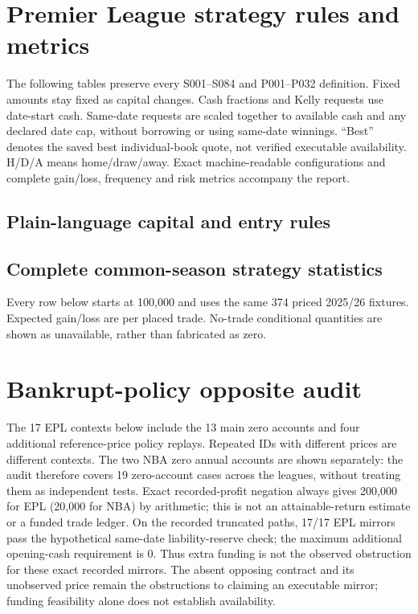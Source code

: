 \documentclass[11pt,letterpaper]{article}
\renewcommand{\arraystretch}{1.15}
\begin{document}
\section{Premier League strategy rules and metrics}
The following tables preserve every S001--S084 and P001--P032 definition.
Fixed amounts stay fixed as capital changes. Cash fractions and Kelly requests
use date-start cash. Same-date requests are scaled together to available cash
and any declared date cap, without borrowing or using same-date winnings.
``Best'' denotes the saved best individual-book quote, not verified executable
availability. H/D/A means home/draw/away. Exact machine-readable configurations
and complete gain/loss, frequency and risk metrics accompany the report.

\subsection{Plain-language capital and entry rules}
{\footnotesize\setlength{\tabcolsep}{3pt}\renewcommand{\arraystretch}{1.08}
}

\subsection{Complete common-season strategy statistics}
Every row below starts at 100,000 and uses the same 374 priced 2025/26 fixtures.
Expected gain/loss are per placed trade. No-trade conditional quantities are
shown as unavailable, rather than fabricated as zero.
{\footnotesize\setlength{\tabcolsep}{3pt}\renewcommand{\arraystretch}{1.08}
}

\clearpage
\section{Bankrupt-policy opposite audit}
The 17 EPL contexts below include the 13 main zero accounts and four
additional reference-price policy replays. Repeated IDs with different
prices are different contexts. The two NBA zero annual accounts are shown
separately: the audit therefore covers 19 zero-account cases across the
leagues, without treating them as independent tests. Exact recorded-profit
negation always gives 200,000 for EPL (20,000 for NBA) by arithmetic; this
is not an attainable-return estimate or a funded trade ledger. On the recorded truncated paths, 17/17 EPL mirrors pass the hypothetical same-date liability-reserve check; the maximum additional opening-cash requirement is 0. Thus extra funding is not the observed obstruction for these exact recorded mirrors. The absent opposing contract and its unobserved price remain the obstructions to claiming an executable mirror; funding feasibility alone does not establish availability.
\end{document}
